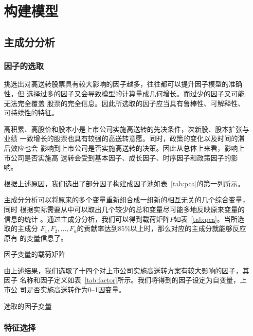 \documentclass[../main]{subfiles}
\begin{document}
\chapter{构建模型}%
\label{cha:establishment}

\section{主成分分析}%
\label{sec:factor}

\subsection{因子的选取}%
\label{sub:factor_chosen}

挑选出对高送转股票具有较大影响的因子越多，往往都可以提升因子模型的准确性，但
选择过多的因子又会导致模型的计算量成几何增长。而过少的因子又可能无法完全覆盖
股票的完全信息。因此所选取的因子应当具有鲁棒性、可解释性、可持续性的特征。

高积累、高股价和股本小是上市公司实施高送转的先决条件，次新股、股本扩张与业绩
一致增长的股票也具有较强的高送转意愿。同时，政策的变化以及时间的滞后效应也会
影响到上市公司是否实施高送转的决策。因此从总体上来看，影响上市公司是否实施高
送转会受到基本因子、成长因子、时序因子和政策因子的影响。

根据上述原因，我们选出了部分因子构建成因子池如表~\ref{tab:pca}的第一列所示。

主成分分析可以将原来的多个变量重新组合成一组新的相互无关的几个综合变量，同时
根据实际需要从中可以取出几个较少的总和变量尽可能多地反映原来变量的信息的统计
。通过主成分分析，我们可以得到载荷矩阵$P$如表~\ref{tab:pca}。当所选取的主成分
$F_1, F_2, \ldots, F_n$的贡献率达到85\%以上时，那么对应的主成分就能够反应原有
的变量信息了。

\begin{table}[htpb]
  \centering
  \caption{因子变量的载荷矩阵}%
  \label{tab:pca}
  \scriptsize
\end{table}

由上述结果，我们选取了十四个对上市公司实施高送转方案有较大影响的因子，其因子
名称和因子定义如表~\ref{tab:factor}所示。我们将得到的因子设定为自变量，上市公
司是否实施高送转作为0--1因变量。

\begin{table}[htpb]
  \centering
  \caption{选取的因子变量}%
  \label{tab:factor}
  \scriptsize
\end{table}

\subsection{特征选择}%
\label{sub:character_select}
\end{document}

